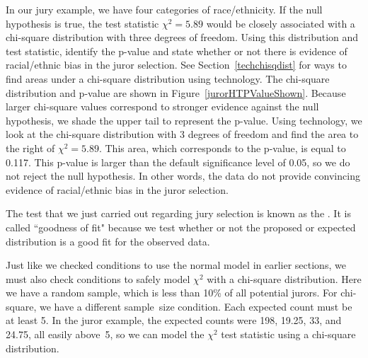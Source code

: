 \begin{examplewrap}
\begin{nexample}{In our jury example, we have four categories of race/ethnicity.  If the null hypothesis is true, the test statistic $\chi^2=5.89$ would be closely associated with a chi-square distribution with three degrees of freedom. Using this distribution and test statistic, identify the p-value and state whether or not there is evidence of racial/ethnic bias in the juror selection.  See Section~\ref{techchisqdist} for ways to find areas under a chi-square distribution using technology.}
The chi-square distribution and p-value are shown in Figure~\ref{jurorHTPValueShown}. Because larger chi-square values correspond to stronger evidence against the null hypothesis, we shade the upper tail to represent the p-value. Using technology, we look at the chi-square distribution with 3 degrees of freedom and find the area to the right of $\chi^2=5.89$.  This area, which corresponds to the p-value, is equal to 0.117.  This p-value is larger than the default significance level of 0.05, so we do not reject the null hypothesis.  In other words, the data do not provide convincing evidence of racial/ethnic bias in the juror selection.
\end{nexample}
\end{examplewrap}



The test that we just carried out regarding jury selection is known as the . It is called ``goodness of fit" because we test whether or not the proposed or expected distribution is a good fit for the observed data.

Just like we checked conditions to use the normal model in earlier sections, we must also check conditions to safely model $\chi^2$ with a chi-square distribution. Here we have a random sample, which is less than 10\% of all potential jurors.  For chi-square, we have a different sample~size condition.  Each expected count must be at least 5. In the juror example, the expected counts were 198, 19.25, 33, and 24.75, all easily above~5, so we can model the $\chi^2$ test statistic using a chi-square distribution.

